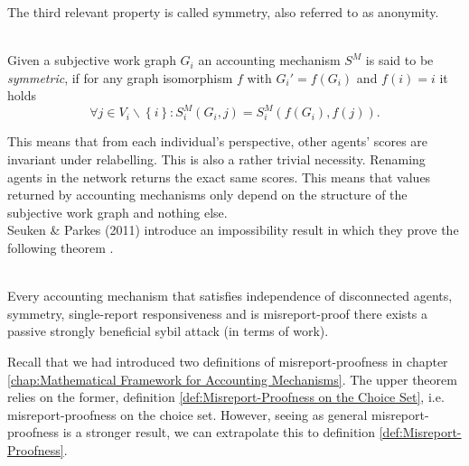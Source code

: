 \noindent{}The third relevant property is called symmetry, also referred to as anonymity. \vspace{1em}

\begin{definition}[Symmetry]\ \\
\label{def:Symmetry}
\noindent{}Given a subjective work graph $G_i$ an accounting mechanism $S^M$ is said to be {\it symmetric}, if for any graph isomorphism $f$
with $G_i'=f(G_i)$ and $f(i)=i$ it holds
\[
\forall{}j\in{}V_i\backslash\left\lbrace{}i\right\rbrace: S^M_i(G_i,j)=S^M_i(f(G_i),f(j)).
\]
\end{definition}

\noindent{}This means that from each individual's perspective, other agents' scores are invariant under relabelling. This is also a rather trivial necessity. Renaming agents in the network returns the exact same scores. This means that values returned by accounting mechanisms only depend on the structure of the subjective work graph and nothing else. \vspace{1em}\\

\noindent{}Seuken \& Parkes (2011) introduce an impossibility result in which they prove the following theorem \cite{On the Sybil-Proofness of Accounting Mechanisms}.

\begin{theorem}[]\ \\
\label{th:SnP Impossibility Result}
\noindent{}Every accounting mechanism that satisfies independence of disconnected agents, symmetry, single-report responsiveness and is misreport-proof there exists a passive strongly beneficial sybil attack (in terms of work).
\end{theorem}

\noindent{}Recall that we had introduced two definitions of misreport-proofness in chapter \ref{chap:Mathematical Framework for Accounting Mechanisms}. The upper theorem relies on the former, definition \ref{def:Misreport-Proofness on the Choice Set}, i.e. misreport-proofness on the choice set. However, seeing as general misreport-proofness is a stronger result, we can extrapolate this to definition \ref{def:Misreport-Proofness}.

